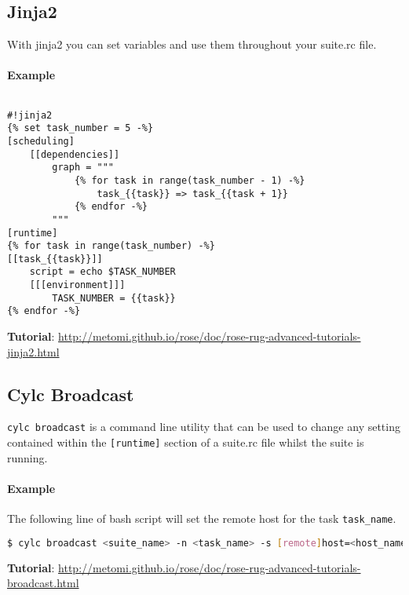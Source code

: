 \subsection{Jinja2}

With jinja2 you can set variables and use them throughout your suite.rc file.

\paragraph{Example} $ $

\begin{lstlisting}
#!jinja2
{% set task_number = 5 -%}
[scheduling]
    [[dependencies]]
        graph = """
            {% for task in range(task_number - 1) -%}
                task_{{task}} => task_{{task + 1}}
            {% endfor -%}
        """
[runtime]
{% for task in range(task_number) -%}
[[task_{{task}}]]
    script = echo $TASK_NUMBER
    [[[environment]]]
        TASK_NUMBER = {{task}}
{% endfor -%}
\end{lstlisting}

\begin{shaded*}
\textbf{Tutorial}: \url{http://metomi.github.io/rose/doc/rose-rug-advanced-tutorials-jinja2.html}
\end{shaded*}

\subsection{Cylc Broadcast}

\lstinline[language=bash]{cylc broadcast} is a command line utility that can
be used to change any setting contained within the \lstinline{[runtime]}
section of a suite.rc file whilst the suite is running.

\paragraph*{Example} The following line of bash script will set the remote
host for the task \lstinline{task_name}.

\begin{lstlisting}[language=bash]
$ cylc broadcast <suite_name> -n <task_name> -s [remote]host=<host_name>
\end{lstlisting}

\begin{shaded*}
\textbf{Tutorial}: \url{http://metomi.github.io/rose/doc/rose-rug-advanced-tutorials-broadcast.html}
\end{shaded*}

